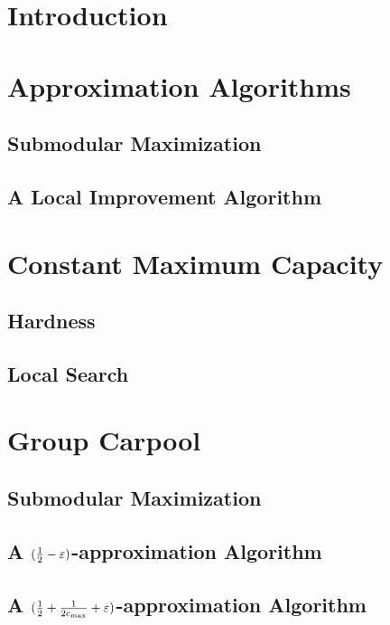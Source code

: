 \begin{abstract}

\end{abstract}

\section{Introduction}


\section{Approximation Algorithms}
\label{sec:approx}


   \subsection{Submodular Maximization}
   \label{sec:sub}
   

   \subsection{A Local Improvement Algorithm}
   \label{sec:improve}
   

\section{Constant Maximum Capacity}
\label{sec:cmax}   


   \subsection{Hardness}
   \label{sec:hardness}
   

   \subsection{Local Search}
   \label{sec:local}
   

\section{Group Carpool}
\label{sec:group}


   \subsection{Submodular Maximization}
   
   
   \subsection{A \texorpdfstring{$(\frac{1}{2} - \varepsilon)$}--approximation
	Algorithm}
   
   
   \subsection{A \texorpdfstring{$(\frac{1}{2} + \frac{1}{2c_{\max}} + \varepsilon)$}--approximation
	Algorithm}
   

